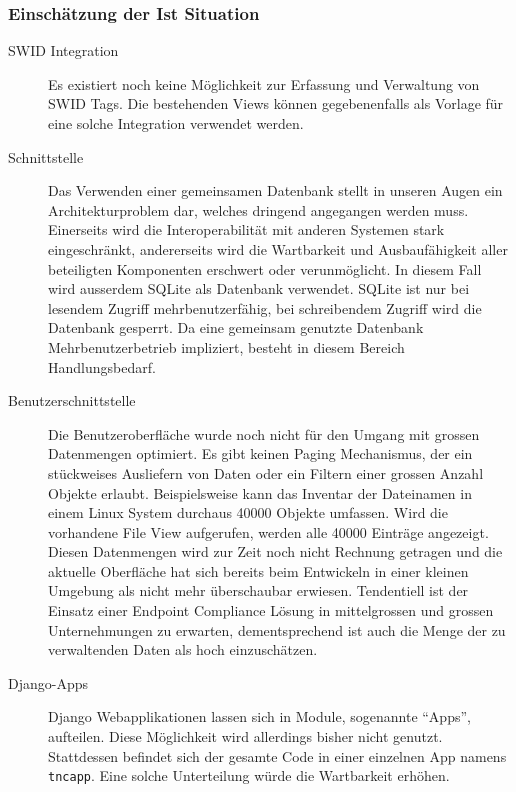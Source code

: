 \subsubsection{Einschätzung der Ist Situation}
\begin{description}

\item[SWID Integration] Es existiert noch keine Möglichkeit zur Erfassung und
	Verwaltung von SWID Tags. Die bestehenden Views können gegebenenfalls als
	Vorlage für eine solche Integration verwendet werden.
	
\item[Schnittstelle] Das Verwenden einer gemeinsamen Datenbank stellt in unseren
	Augen ein Architekturproblem dar, welches dringend angegangen werden muss.
	Einerseits wird die Interoperabilität mit anderen Systemen stark
	eingeschränkt, andererseits wird die Wartbarkeit und Ausbaufähigkeit aller
	beteiligten Komponenten erschwert oder verunmöglicht. In diesem Fall wird
	ausserdem SQLite als Datenbank verwendet. SQLite ist nur bei lesendem Zugriff
	mehrbenutzerfähig, bei schreibendem Zugriff wird die Datenbank gesperrt. Da
	eine gemeinsam genutzte Datenbank Mehrbenutzerbetrieb impliziert, besteht in
	diesem Bereich Handlungsbedarf.

\item[Benutzerschnittstelle] Die Benutzeroberfläche wurde noch nicht für den
	Umgang mit grossen Datenmengen optimiert. Es gibt keinen Paging Mechanismus,
	der ein stückweises Ausliefern von Daten oder ein Filtern einer grossen Anzahl
	Objekte erlaubt. Beispielsweise kann das Inventar der Dateinamen in einem
	Linux System durchaus 40000 Objekte umfassen. Wird die vorhandene File View
	aufgerufen, werden alle 40000 Einträge angezeigt.\\ Diesen Datenmengen wird
	zur Zeit noch nicht Rechnung getragen und die aktuelle Oberfläche hat sich
	bereits beim Entwickeln in einer kleinen Umgebung als nicht mehr überschaubar
	erwiesen. Tendentiell ist der Einsatz einer Endpoint Compliance Lösung in
	mittelgrossen und grossen Unternehmungen zu erwarten, dementsprechend ist auch
	die Menge der zu verwaltenden Daten als hoch einzuschätzen.

\item[Django-Apps] Django Webapplikationen lassen sich in Module, sogenannte
	\enquote{Apps}, aufteilen. Diese Möglichkeit wird allerdings bisher nicht
	genutzt. Stattdessen befindet sich der gesamte Code in einer einzelnen App
	namens \texttt{tncapp}. Eine solche Unterteilung würde die Wartbarkeit
	erhöhen.


\end{description}
